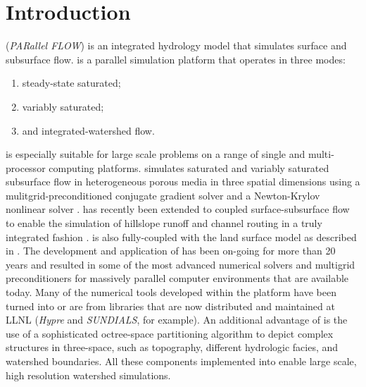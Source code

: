
\chapter{Introduction}
\label{Introduction}

\parflow{} (\emph{PARallel FLOW}) is an integrated hydrology 
model that simulates surface and subsurface flow.
\parflow{} \cite{Ashby-Falgout90, Jones-Woodward01, KM06, M13} 
is a parallel simulation platform that operates in three modes:\begin{enumerate}
\item
steady-state saturated; 
\item
variably saturated; 
\item
and integrated-watershed flow.
\end{enumerate}
\parflow{} is especially suitable for large scale problems on a range
of single and multi-processor computing platforms. \parflow{}
simulates saturated and variably saturated
subsurface flow in heterogeneous porous media in three spatial
dimensions using a mulitgrid-preconditioned conjugate gradient solver
\cite{Ashby-Falgout90} and a Newton-Krylov nonlinear solver
\cite{Jones-Woodward01}. \parflow{} has recently been extended to
coupled surface-subsurface flow to enable the simulation of hillslope
runoff and channel routing in a truly integrated fashion
\cite{KM06}. \parflow{} is also fully-coupled with the land surface
model  \cite{Dai03} as described in \cite{MM05,KM08a}.  The
development and application of \parflow{} has been on-going for more
than 20 years \cite{Meyerhoff14a, Meyerhoff14b, Meyerhoff11, Mikkelson13,
Rihani10, Shrestha14, Siirila12a,
Siirila12b, Siirila12c, Sulis10, Williams11, Williams13, Ferg10, Keyes13, 
Kollat11, Condon13a, Condon13b, M13, KRM10, KRM10, SNSMM10, DMC10, AM10,
MLMSWT10, M10, FM10, KMWSVVS10, SMPMPK10, FFKM09, KCSMMB09, MTK09, dBRM08, 
MK08b, KM08b, KM08a, MK08a, MCT08,MCK07,MWH07,
  KM06, MM05, TMCZPS05, MWT03, Teal02, WGM02, Jones-Woodward01, MCT00,
  TCRM99, TBP99, TFSBA98, Ashby-Falgout90} and resulted in some of the
most advanced numerical solvers and multigrid preconditioners for
massively parallel computer environments that are available
today. Many of the numerical tools developed within the \parflow{}
platform have been turned into or are from libraries that are now
distributed and maintained at LLNL ({\em Hypre} and {\em SUNDIALS},
for example).  An additional advantage of \parflow{} is the use of a
sophisticated octree-space partitioning algorithm to depict complex
structures in three-space, such as topography, different hydrologic
facies, and watershed boundaries. All these components implemented
into \parflow{} enable large scale, high resolution watershed
simulations. 

